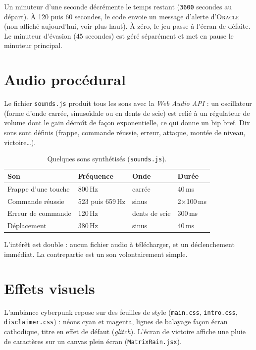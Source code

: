 \documentclass[11pt,a4paper]{report}
\newcommand{\file}[1]{\texttt{\nolinkurl{#1}}}
\begin{document}
Un minuteur d'une seconde d\'ecr\'emente le temps restant (\texttt{3600} secondes au
d\'epart). \`A 120 puis 60 secondes, le code envoie un message d'alerte d'\textsc{Oracle}
(non affich\'e aujourd'hui, voir plus haut). \`A z\'ero, le jeu passe \`a l'\'ecran de d\'efaite. Le minuteur d'\'evasion (45 secondes) est g\'er\'e
s\'epar\'ement et met en pause le minuteur principal.

\section{Audio proc\'edural}

Le fichier \file{sounds.js} produit tous les sons avec la \emph{Web Audio API} : un
oscillateur (forme d'onde carr\'ee, sinuso\"idale ou en dents de scie) est reli\'e \`a un
r\'egulateur de volume dont le gain d\'ecro\^it de fa\c con exponentielle, ce qui donne un
bip bref. Dix sons sont d\'efinis (frappe, commande r\'eussie, erreur, attaque, mont\'ee
de niveau, victoire\ldots).

\begin{table}[H]
\centering
\small
\begin{tabular}{@{}llll@{}}
\toprule
\textbf{Son} & \textbf{Fr\'equence} & \textbf{Onde} & \textbf{Dur\'ee} \\
\midrule
Frappe d'une touche & 800\,Hz & carr\'ee & 40\,ms \\
Commande r\'eussie  & 523 puis 659\,Hz & sinus & 2$\times$100\,ms \\
Erreur de commande  & 120\,Hz & dents de scie & 300\,ms \\
D\'eplacement       & 380\,Hz & sinus & 40\,ms \\
\bottomrule
\end{tabular}
\caption{Quelques sons synth\'etis\'es (\file{sounds.js}).}
\end{table}

L'int\'er\^et est double : aucun fichier audio \`a t\'el\'echarger, et un d\'eclenchement
imm\'ediat. La contrepartie est un son volontairement simple.

\section{Effets visuels}

L'ambiance cyberpunk repose sur des feuilles de style (\texttt{main.css},
\texttt{intro.css}, \texttt{disclaimer.css}) : n\'eons cyan et magenta, lignes de balayage
fa\c con \'ecran cathodique, titre en effet de d\'efaut (\emph{glitch}). L'\'ecran de victoire
affiche une \og pluie \fg{} de caract\`eres sur un canvas plein \'ecran (\file{MatrixRain.jsx}).
\end{document}
